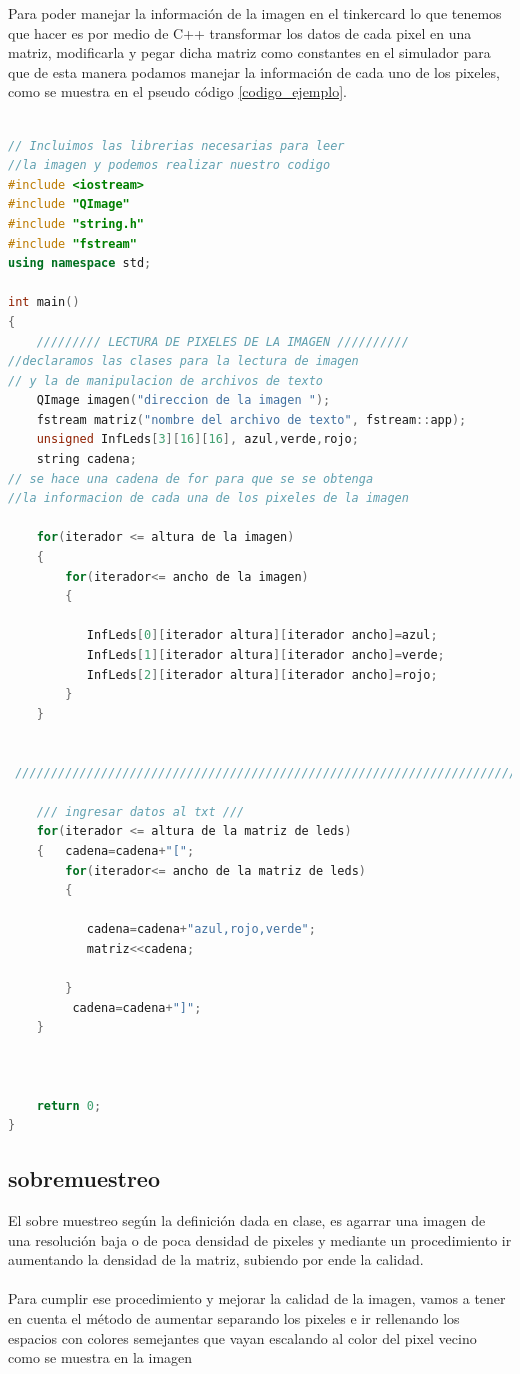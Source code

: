 \documentclass{article}
\begin{document}
Para poder manejar la información de la imagen en el tinkercard lo que tenemos que hacer es por medio de C++ transformar los datos de cada pixel en una matriz, modificarla y pegar dicha matriz como constantes en el simulador para que de esta manera podamos manejar la información de cada uno de los pixeles, como se muestra en el pseudo código \ref{codigo_ejemplo}. 
\begin{lstlisting}[language=C++, label=codigo_ejemplo]

// Incluimos las librerias necesarias para leer
//la imagen y podemos realizar nuestro codigo
#include <iostream>
#include "QImage"
#include "string.h"
#include "fstream"
using namespace std;

int main()
{
    ///////// LECTURA DE PIXELES DE LA IMAGEN //////////
//declaramos las clases para la lectura de imagen
// y la de manipulacion de archivos de texto
    QImage imagen("direccion de la imagen ");
    fstream matriz("nombre del archivo de texto", fstream::app);
    unsigned InfLeds[3][16][16], azul,verde,rojo;
    string cadena;
// se hace una cadena de for para que se se obtenga
//la informacion de cada una de los pixeles de la imagen

    for(iterador <= altura de la imagen)
    {
        for(iterador<= ancho de la imagen)
        {

           InfLeds[0][iterador altura][iterador ancho]=azul;
           InfLeds[1][iterador altura][iterador ancho]=verde;
           InfLeds[2][iterador altura][iterador ancho]=rojo;
        }
    }


 /////////////////////////////////////////////////////////////////////////////////////////

    /// ingresar datos al txt ///
    for(iterador <= altura de la matriz de leds)
    {   cadena=cadena+"[";
        for(iterador<= ancho de la matriz de leds)
        {

           cadena=cadena+"azul,rojo,verde";
           matriz<<cadena;

        }
         cadena=cadena+"]";
    }



    return 0;
}
\end{lstlisting}

\subsection{sobremuestreo} \label{contenido}
El sobre muestreo según la definición dada en clase, es agarrar una imagen de una resolución baja o de poca densidad de pixeles y mediante un procedimiento ir aumentando la densidad   de la matriz, subiendo por ende la calidad.\\\\
Para cumplir ese procedimiento y mejorar la calidad de la imagen, vamos a tener en cuenta el  método de aumentar  separando los pixeles e ir rellenando los espacios con colores semejantes que vayan escalando al color del pixel vecino como se muestra en la imagen 
\end{document}
